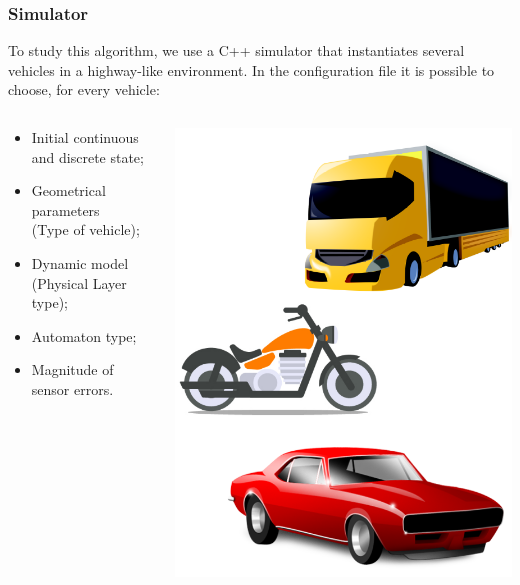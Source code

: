 \documentclass{beamer}
\begin{document}
\begin{frame}
\frametitle{Simulator}

To study this algorithm, we use a C++ simulator that instantiates several vehicles in a highway-like environment. 
In the configuration file it is possible to choose, for every vehicle:
\begin{columns}
\begin{column}{0.6\textwidth}
\begin{itemize}
\item Initial continuous and discrete state;
\item Geometrical parameters \\(Type of vehicle);
\item Dynamic model (Physical Layer type);
\item Automaton type;
\item Magnitude of sensor errors.
\end{itemize}
\end{column}
\begin{column}{0.4\textwidth}
\centering
\includegraphics[scale=0.15]{vehicletypes}
\end{column}
\end{columns}



\end{frame}
\end{document}
